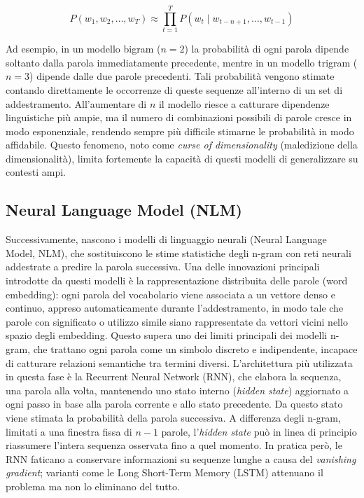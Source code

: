 \[
P(w_1, w_2, \dots, w_T) \approx \prod_{t=1}^{T} P(w_t \mid w_{t-n+1}, \dots, w_{t-1})
\]

Ad esempio, in un modello bigram ($n=2$) la probabilità di ogni parola dipende soltanto dalla parola immediatamente precedente, 
mentre in un modello trigram ($n=3$) dipende dalle due parole precedenti. Tali probabilità vengono stimate contando direttamente 
le occorrenze di queste sequenze all'interno di un set di addestramento. All'aumentare di $n$ il modello riesce a catturare
dipendenze linguistiche più ampie, ma il numero di combinazioni possibili di parole cresce in modo esponenziale, rendendo sempre 
più difficile stimarne le probabilità in modo affidabile. Questo fenomeno, noto come \emph{curse of dimensionality} (maledizione della 
dimensionalità), limita fortemente la capacità di questi modelli di generalizzare su contesti ampi.

\subsection{Neural Language Model (NLM)}
Successivamente, nascono i modelli di linguaggio neurali (Neural Language Model, NLM), che sostituiscono le stime statistiche degli 
n-gram con reti neurali addestrate a predire la parola successiva. Una delle innovazioni principali introdotte da questi modelli 
è la rappresentazione distribuita delle parole (word embedding): ogni parola del vocabolario viene associata a un vettore denso 
e continuo, appreso automaticamente durante l'addestramento, in modo tale che parole con significato o utilizzo simile siano 
rappresentate da vettori vicini nello spazio degli embedding. Questo supera uno dei limiti principali dei modelli n-gram, 
che trattano ogni parola come un simbolo discreto e indipendente, incapace di catturare relazioni semantiche tra termini diversi.
L'architettura più utilizzata in questa fase è la Recurrent Neural Network (RNN), che elabora la sequenza, una parola alla volta, mantenendo
 uno stato interno (\emph{hidden state}) aggiornato a ogni passo in base alla parola corrente e allo stato precedente. 
 Da questo stato viene stimata la probabilità della parola successiva. A differenza degli n-gram, limitati a una finestra fissa di $n-1$ parole,
  l'\emph{hidden state} può in linea di principio riassumere l'intera sequenza osservata fino a quel momento. In pratica però, le RNN faticano
   a conservare informazioni su sequenze lunghe a causa del \emph{vanishing gradient}; varianti come le Long Short-Term Memory (LSTM) attenuano
 il problema ma non lo eliminano del tutto.
